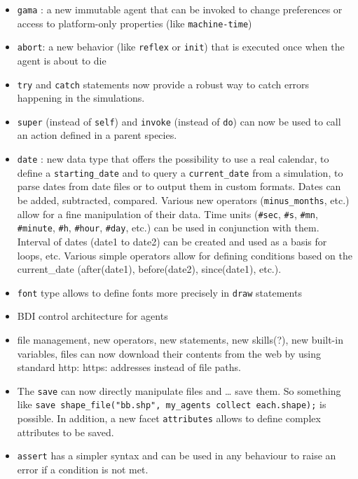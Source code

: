 \documentclass[]{book}
\providecommand{\tightlist}{%
  \setlength{\itemsep}{0pt}\setlength{\parskip}{0pt}}
\theoremstyle{definition}
\theoremstyle{definition}
\theoremstyle{definition}
\theoremstyle{remark}
\begin{document}
\begin{itemize}
\tightlist
\item
  \texttt{gama} : a new immutable agent that can be invoked to change
  preferences or access to platform-only properties (like
  \texttt{machine-time})
\item
  \texttt{abort}: a new behavior (like \texttt{reflex} or \texttt{init})
  that is executed once when the agent is about to die
\item
  \texttt{try} and \texttt{catch} statements now provide a robust way to
  catch errors happening in the simulations.
\item
  \texttt{super} (instead of \texttt{self}) and \texttt{invoke} (instead
  of \texttt{do}) can now be used to call an action defined in a parent
  species.
\item
  \texttt{date} : new data type that offers the possibility to use a
  real calendar, to define a \texttt{starting\_date} and to query a
  \texttt{current\_date} from a simulation, to parse dates from date
  files or to output them in custom formats. Dates can be added,
  subtracted, compared. Various new operators (\texttt{minus\_months},
  etc.) allow for a fine manipulation of their data. Time units
  (\texttt{\#sec}, \texttt{\#s}, \texttt{\#mn}, \texttt{\#minute},
  \texttt{\#h}, \texttt{\#hour}, \texttt{\#day}, etc.) can be used in
  conjunction with them. Interval of dates (date1 to date2) can be
  created and used as a basis for loops, etc. Various simple operators
  allow for defining conditions based on the current\_date
  (after(date1), before(date2), since(date1), etc.).
\item
  \texttt{font} type allows to define fonts more precisely in
  \texttt{draw} statements
\item
  BDI control architecture for agents
\item
  file management, new operators, new statements, new skills(?), new
  built-in variables, files can now download their contents from the web
  by using standard http: https: addresses instead of file paths.
\item
  The \texttt{save} can now directly manipulate files and \ldots{} save
  them. So something like
  \texttt{save\ shape\_file("bb.shp",\ my\_agents\ collect\ each.shape);}
  is possible. In addition, a new facet \texttt{attributes} allows to
  define complex attributes to be saved.
\item
  \texttt{assert} has a simpler syntax and can be used in any behaviour
  to raise an error if a condition is not met.

\end{itemize}
\end{document}
